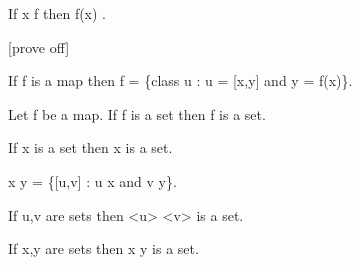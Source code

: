 \documentclass[a4paper,draft]{amsproc}
\begin{document}
\begin{forthel}
\begin{theorem}[69b]
If x \in \domain f then f(x) \in {}.
\end{theorem}

	[prove off]
\begin{theorem}[70]
If f is a map then f = \{class u : u = [x,y] and y = f(x)\}.
\end{theorem}


\begin{axiom}[V]
Let f be a map. If \domain f is a set then \range f is a set.
\end{axiom}

\begin{axiom}[VI]
If x is a set then \bigcup x is a set.
\end{axiom}

\begin{definition}[72]
 x \times y = \{[u,v] : u \in x and v \in y\}.
\end{definition}

\begin {theorem}[73]
If u,v are sets then <u> \times <v> is a set.
\end{theorem}

\begin{theorem}[74]
If x,y are sets then x \times y is a set.
\end{theorem}


\end{forthel}
\end{document}
